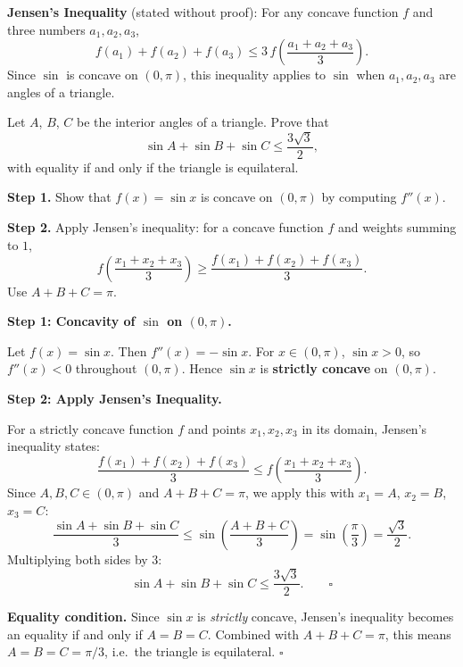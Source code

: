 \begin{problem}
\textbf{Jensen's Inequality} (stated without proof): For any concave function $f$ and three numbers $a_1, a_2, a_3$,
\[
f(a_1) + f(a_2) + f(a_3) \le 3\,f\!\left(\frac{a_1+a_2+a_3}{3}\right).
\]
Since $\sin$ is concave on $(0,\pi)$, this inequality applies to $\sin$ when $a_1, a_2, a_3$ are angles of a triangle.


Let $A$, $B$, $C$ be the interior angles of a triangle. Prove that
\[
\sin A + \sin B + \sin C \le \frac{3\sqrt{3}}{2},
\]
with equality if and only if the triangle is equilateral.
\end{problem}

\begin{hintbox}
\textbf{Step 1.} Show that $f(x) = \sin x$ is concave on $(0, \pi)$ by computing $f''(x)$.

\textbf{Step 2.} Apply Jensen's inequality: for a concave function $f$ and weights summing to $1$,
\[
f\!\left(\frac{x_1+x_2+x_3}{3}\right) \ge \frac{f(x_1)+f(x_2)+f(x_3)}{3}.
\]
Use $A + B + C = \pi$.
\end{hintbox}

\begin{solution}

\textbf{Step 1: Concavity of $\sin$ on $(0, \pi)$.}

Let $f(x) = \sin x$. Then $f''(x) = -\sin x$. For $x \in (0, \pi)$, $\sin x > 0$, so
$f''(x) < 0$ throughout $(0, \pi)$. Hence $\sin x$ is \textbf{strictly concave} on $(0, \pi)$.

\medskip
\textbf{Step 2: Apply Jensen's Inequality.}

For a strictly concave function $f$ and points $x_1, x_2, x_3$ in its domain,
Jensen's inequality states:
\[
\frac{f(x_1) + f(x_2) + f(x_3)}{3} \le f\!\left(\frac{x_1+x_2+x_3}{3}\right).
\]
Since $A, B, C \in (0, \pi)$ and $A + B + C = \pi$, we apply this with $x_1 = A$, $x_2 = B$,
$x_3 = C$:
\[
\frac{\sin A + \sin B + \sin C}{3}
\le \sin\!\left(\frac{A+B+C}{3}\right)
= \sin\!\left(\frac{\pi}{3}\right)
= \frac{\sqrt{3}}{2}.
\]
Multiplying both sides by $3$:
\[
\sin A + \sin B + \sin C \le \frac{3\sqrt{3}}{2}. \qquad\square
\]

\medskip
\textbf{Equality condition.} Since $\sin x$ is \emph{strictly} concave, Jensen's inequality
becomes an equality if and only if $A = B = C$. Combined with $A + B + C = \pi$, this means
$A = B = C = \pi/3$, i.e.\ the triangle is equilateral. $\square$

\end{solution}

